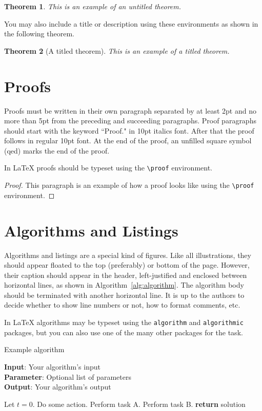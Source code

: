 \documentclass{article}
\newtheorem{theorem}{Theorem}
\begin{document}
\begin{theorem}
This is an example of an untitled theorem.
\end{theorem}

You may also include a title or description using these environments as shown in the following theorem.

\begin{theorem}[A titled theorem]
This is an example of a titled theorem.
\end{theorem}

\section{Proofs}

Proofs must be written in their own paragraph separated by at least 2pt and no more than 5pt from the preceding and succeeding paragraphs. Proof paragraphs should start with the keyword ``Proof." in 10pt italics font. After that the proof follows in regular 10pt font. At the end of the proof, an unfilled square symbol (qed) marks the end of the proof.

In \LaTeX{} proofs should be typeset using the \texttt{\textbackslash{proof}} environment.

\begin{proof}
This paragraph is an example of how a proof looks like using the \texttt{\textbackslash{proof}} environment. 
\end{proof}


\section{Algorithms and Listings}

Algorithms and listings are a special kind of figures. Like all illustrations, they should appear floated to the top (preferably) or bottom of the page. However, their caption should appear in the header, left-justified and enclosed between horizontal lines, as shown in Algorithm~\ref{alg:algorithm}. The algorithm body should be terminated with another horizontal line. It is up to the authors to decide whether to show line numbers or not, how to format comments, etc.

In \LaTeX{} algorithms may be typeset using the {\tt algorithm} and {\tt algorithmic} packages, but you can also use one of the many other packages for the task.  

\begin{algorithm}[tb]
\caption{Example algorithm}
\label{alg:algorithm}
\textbf{Input}: Your algorithm's input\\
\textbf{Parameter}: Optional list of parameters\\
\textbf{Output}: Your algorithm's output
\begin{algorithmic}[1] %
\STATE Let $t=0$.
\STATE Do some action.
\STATE Perform task A.
\ELSE
\STATE Perform task B.
\ENDIF
\ENDWHILE
\STATE \textbf{return} solution
\end{algorithmic}
\end{algorithm}
\end{document}

